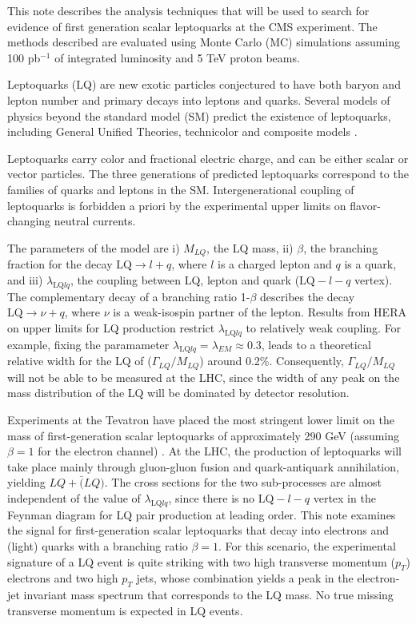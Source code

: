 This note describes the analysis techniques that will be used to search for evidence of first generation scalar leptoquarks 
at the CMS experiment. The methods described are evaluated using Monte Carlo (MC) simulations assuming 
100 pb$^{-1}$ of integrated luminosity and 5 TeV proton beams.

Leptoquarks (LQ) are new exotic particles conjectured to have both baryon and lepton number and primary decays into leptons and quarks.    
Several models of physics beyond the standard model (SM) predict the existence of leptoquarks, including General Unified Theories, 
technicolor and composite models \cite{theories}.  

Leptoquarks carry color and fractional electric 
charge, and can be either scalar or vector particles. The three generations of predicted leptoquarks 
correspond to the families of quarks and leptons in the SM.  Intergenerational coupling of leptoquarks is forbidden 
a priori by the experimental upper limits on flavor-changing neutral currents. 

The parameters of the model are i) $M_{LQ}$, the LQ mass, ii) $\beta$, the branching fraction for the decay 
$\mbox{LQ} \rightarrow l + q$, where $l$ is a charged lepton and $q$ is a quark, and
iii) $\lambda_{\mbox{LQ}lq}$, the coupling between LQ, lepton and quark ($\mbox{LQ}-l-q$ vertex). 
The complementary decay of a branching ratio 1-$\beta$ describes the decay $\mbox{LQ} \rightarrow \nu + q$, 
where $\nu$ is a weak-isospin partner of the lepton.
Results from HERA on upper limits for LQ production restrict  
$\lambda_{\mbox{LQ}lq}$ to relatively weak coupling\cite{hera}. For example, fixing the paramameter 
$\lambda_{\mbox{LQ}lq} = \lambda_{EM} \approx 0.3$, leads to 
a theoretical relative width for the LQ of ($\Gamma_{LQ}/M_{LQ}$) around 0.2\%. 
Consequently, $\Gamma_{LQ}/M_{LQ}$ will not be able to be measured at the LHC, since 
the width of any peak on the mass distribution of the LQ will be dominated by detector resolution.  

Experiments at the Tevatron have placed the most stringent lower limit on the mass of first-generation scalar 
leptoquarks of approximately 290 GeV (assuming $\beta=1$ for the electron channel) \cite{d02008}.
At the LHC, the production of leptoquarks will take place mainly through gluon-gluon fusion and 
quark-antiquark annihilation, yielding $LQ + \bar(LQ)$. 
The cross sections for the two sub-processes are almost independent of the value of 
$\lambda_{\mbox{LQ}lq}$, since there is no $\mbox{LQ}-l-q$ vertex in the Feynman diagram for LQ pair production 
at leading order. This note examines the signal for first-generation scalar leptoquarks that decay into electrons and 
(light) quarks with a branching ratio $\beta=1$. 
For this scenario, the experimental signature of a LQ event is quite striking with two 
high transverse momentum ($p_T$) electrons and two high $p_T$ jets, 
whose combination yields a peak in the electron-jet invariant mass 
spectrum that corresponds to the LQ mass. No true missing transverse momentum is expected in LQ events.

